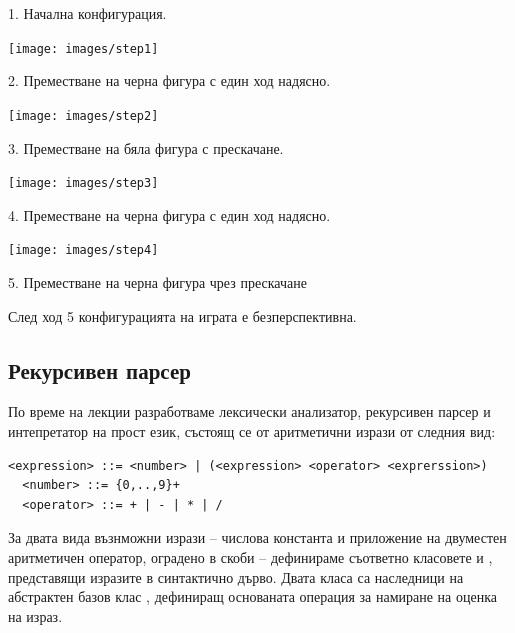 {\begin{enumerate}[resume]
\begin{mdframed}[hidealllines=true,backgroundcolor=gray!20]
\begin{flushleft}
		1. Начална конфигурация.
		\end{flushleft}


		\begin{flushleft}
		\texttt{[image: images/step1]}

		2. Преместване на черна фигура с един ход надясно.
		\end{flushleft}

		\begin{flushleft}
		\texttt{[image: images/step2]}

		\relscale{0.8}
		3. Преместване на бяла фигура с прескачане.
		\end{flushleft}

		\begin{flushleft}
		\texttt{[image: images/step3]}

		4. Преместване на черна фигура с един ход надясно.
		\end{flushleft}

		\begin{flushleft}
		\texttt{[image: images/step4]}

		\relscale{0.8}
		5. Преместване на черна фигура чрез прескачане
		\end{flushleft}

		След ход 5 конфигурацията на играта е безперспективна.

	\end{mdframed}

\end{enumerate}

\subsection{Рекурсивен парсер}


\begin{mdframed}[hidealllines=true,backgroundcolor=gray!20]
По време на лекции разработваме лексически анализатор, рекурсивен парсер и интепретатор на прост език, състоящ се от аритметични изрази от следния вид:
\begin{flushleft}
  \begin{lstlisting}[mathescape]
  <expression> ::= <number> | (<expression> <operator> <exprerssion>)
  <number> ::= {0,..,9}+
  <operator> ::= + | - | * | /
  \end{lstlisting}
\end{flushleft}

За двата вида възнможни изрази -- числова константа и приложение на двуместен аритметичен оператор, оградено в скоби -- дефинираме съответно класовете  и , представящи изразите в синтактично дърво. Двата класа са наследници на абстрактен базов клас , дефиниращ основаната операция  за намиране на оценка на израз.


\end{mdframed}}
